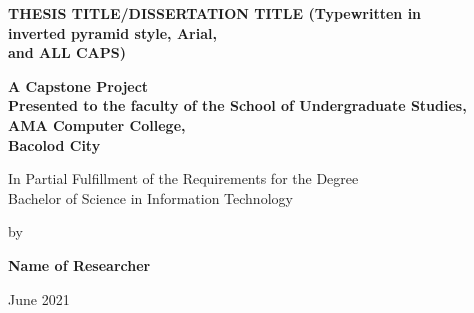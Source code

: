 \begin{titlepage}
    \begin{center}
        \vspace*{6em}

        \textbf{\fontsize{14pt}{14.28pt}\selectfont
            THESIS TITLE/DISSERTATION TITLE (Typewritten in\\
            inverted pyramid style, Arial, \\
            and ALL CAPS)
        }

        \vspace{6em}

         \textbf{
            A Capstone Project\\
            Presented to the faculty of the School of Undergraduate Studies,\\
            AMA Computer College, \\
            Bacolod City
         }
             
        \vspace{6em} 

        In Partial Fulfillment of the Requirements for the Degree\\
        Bachelor of Science in Information Technology

        \vspace{8em}
        by 
        \vspace{4em}

        \textbf{Name of Researcher}

        \vspace{2em}

        June 2021
        
             
    \end{center}
 \end{titlepage}